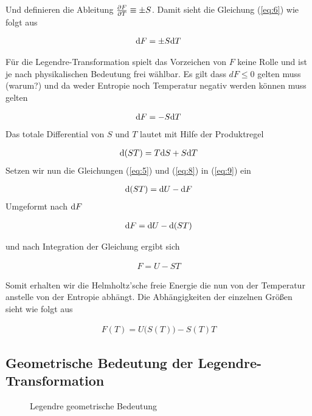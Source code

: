 Und definieren die Ableitung \(\pdiff F_T\equiv \pm S\). Damit sieht die Gleichung (\ref{eq:6}) wie folgt aus

\begin{align}
  \label{eq:7}
  \diff F = \pm S \diff T
\end{align}

Für die Legendre-Transformation spielt das Vorzeichen von \(F\) keine Rolle und ist je nach physikalischen Bedeutung frei wählbar. Es gilt dass \(dF\le 0\) gelten muss (warum?) und da weder Entropie noch Temperatur negativ werden können muss gelten

\begin{align}
  \label{eq:8}
  \diff F = -S\diff T
\end{align}
Das totale Differential von \(S\) und \(T\) lautet mit Hilfe der Produktregel

\begin{align}
  \label{eq:9}
  \diff (ST) = T\diff S + S\diff T
\end{align}
Setzen wir nun die Gleichungen  (\ref{eq:5}) und (\ref{eq:8}) in (\ref{eq:9}) ein

\begin{align}
  \label{eq:10}
  \diff (ST) = \diff U - \diff F
\end{align}
Umgeformt nach \(\diff F\) 

\begin{align}
  \label{eq:11}
  \diff F = \diff U - \diff(ST)
\end{align}

und nach Integration der Gleichung ergibt sich

\begin{align}
  \label{eq:12}
\boxed{  F = U - ST }
\end{align}

Somit erhalten wir die Helmholtz’sche freie Energie die nun von der Temperatur anstelle von der Entropie abhängt. Die Abhängigkeiten der einzelnen Größen sieht wie folgt aus

\begin{align}
  \label{eq:13}
  F(T) = U\Big(S(T)\Big) - S(T)T
\end{align}

\subsection{Geometrische Bedeutung der Legendre-Transformation}


\begin{figure}
  \centering
    
  \caption{Legendre geometrische Bedeutung}
  \label{fig:1}
\end{figure}


